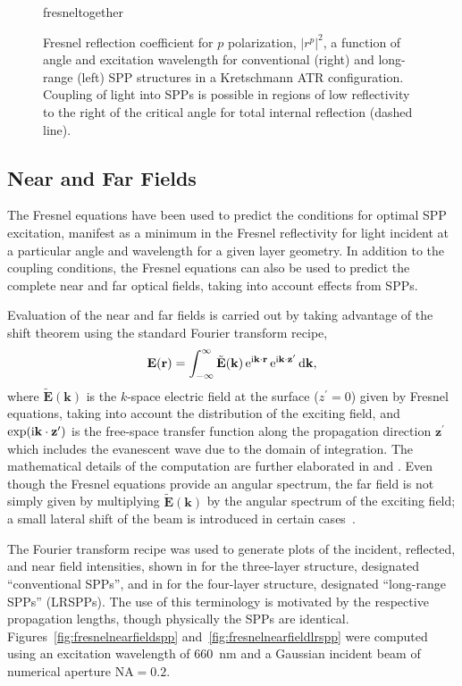 \begin{figure}[ht]
\centering
{fresneltogether}
\caption{Fresnel reflection coefficient for $p$ polarization, $|r^p|^2$, a
function of angle and excitation wavelength for conventional (right) and
long-range (left) SPP structures in a Kretschmann ATR configuration.
Coupling of light into SPPs is possible in regions of low reflectivity to the right of the
critical angle for total internal reflection (dashed line).}
\label{fig:fresnelangle}
\end{figure}

\subsection{Near and Far Fields}\label{sec:fresnelnearfar}
The Fresnel equations have been used to predict the conditions for
optimal SPP excitation, manifest as a minimum in the Fresnel reflectivity
for light incident at a particular angle and wavelength for a given layer
geometry.  In addition to the coupling conditions, the Fresnel equations
can also be used to predict the complete near and far optical fields,
taking into account effects from SPPs.

Evaluation of the near and far fields is carried out by taking advantage of
the shift theorem using the standard Fourier transform recipe,
\begin{equation}
\mathbf{E}(\mathbf{r}) = \int_{-\infty}^{\infty} \tilde{\mathbf{E}}(\mathbf{k})
\,{\mathrm{e}}^{{\mathrm{i}} \mathbf{k} \cdot \mathbf{r}}
\,{\mathrm{e}}^{{\mathrm{i}} \mathbf{k} \cdot \mathbf{z}^\prime} \,\mathrm{d} \mathbf{k},
\end{equation}
where $\tilde{\mathbf{E}}(\mathbf{k})$ is the $k$-space electric field at
the surface ($z^\prime=0$) given by Fresnel equations, taking into account
the distribution of the exciting field, and $\exp({\mathrm{i}} \mathbf{k} \cdot
\mathbf{z}^\prime)$ is the free-space transfer function along the
propagation direction $\mathbf{z}^\prime$ which includes the evanescent
wave due to the domain of integration.  The mathematical details of the
computation are further elaborated in  and
.  Even though the Fresnel equations provide
an angular spectrum, the far field is not simply given by multiplying
$\tilde{\mathbf{E}}(\mathbf{k})$ by the angular spectrum of the exciting
field; a small lateral shift of the beam is introduced in certain
cases~\cite{chuang1986lateral}.

The Fourier transform recipe was used to generate plots of the incident,
reflected, and near field intensities, shown in
 for the three-layer structure, designated
``conventional SPPs'', and in  for the
four-layer structure, designated ``long-range SPPs'' (LRSPPs).  The use of
this terminology is motivated by the respective propagation lengths,
though physically the SPPs are identical.
Figures~\ref{fig:fresnelnearfieldspp} and~\ref{fig:fresnelnearfieldlrspp}
were computed using an excitation wavelength of \SI{660}{\nano\meter}
and a Gaussian incident beam of numerical aperture $\mathrm{NA}=0.2$.


